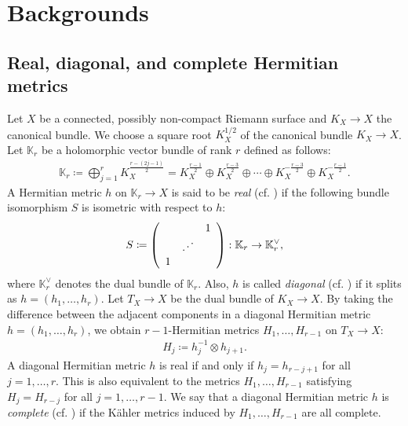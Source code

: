 \documentclass[12pt]{article}
\theoremstyle{definition}
\def\K{{\mathbb K}}
\begin{document}
\section{Backgrounds}\label{2}
\subsection{Real, diagonal, and complete Hermitian metrics}\label{rdc}
Let $X$ be a connected, possibly non-compact Riemann surface and $K_X\rightarrow X$ the canonical bundle. We choose a square root $K_X^{1/2}$ of the canonical bundle $K_X\rightarrow X$. Let $\K_r$ be a holomorphic vector bundle of rank $r$ defined as follows:
\begin{align*}
\K_r\coloneqq \bigoplus_{j=1}^r K_X^{\frac{r-(2j-1)}{2}} = K_X^{\frac{r-1}{2}} \oplus K_X^{\frac{r-3}{2}} \oplus \cdots \oplus K_X^{-\frac{r-3}{2}} \oplus K_X^{-\frac{r-1}{2}}.
\end{align*}
A Hermitian metric $h$ on $\K_r\rightarrow X$ is said to be {\it real} (cf. \cite{Hit2}) if the following bundle isomorphism $S$ is isometric with respect to $h$:
\begin{align*}
S\coloneqq \left(
\begin{array}{ccc}
& & 1 \\ 
& \reflectbox{$\ddots$} & \\ 
1 & &
\end{array}
\right): \K_r\rightarrow \K_r^{\vee},
\end{align*}
where $\K_r^{\vee}$ denotes the dual bundle of $\K_r$. Also, $h$ is called {\it diagonal} (cf. \cite{Bar1, Col1, DL2}) if it splits as $h=(h_1,\dots, h_r)$. Let $T_X\rightarrow X$ be the dual bundle of $K_X\rightarrow X$. By taking the difference between the adjacent components in a diagonal Hermitian metric $h=(h_1,\dots, h_r)$, we obtain $r-1$-Hermitian metrics $H_1,\dots, H_{r-1}$ on $T_X\rightarrow X$:
\begin{align*}
H_j\coloneqq h_j^{-1}\otimes h_{j+1}.
\end{align*}
A diagonal Hermitian metric $h$ is real if and only if $h_j=h_{r-j+1}$ for all $j=1,\dots, r$. This is also equivalent to the metrics $H_1,\dots, H_{r-1}$ satisfying $H_j=H_{r-j}$ for all $j=1,\dots, r-1$. We say that a diagonal Hermitian metric $h$ is {\it complete} (cf. \cite{LM1}) if the K\"ahler metrics induced by $H_1,\dots, H_{r-1}$ are all complete. 
\end{document}
